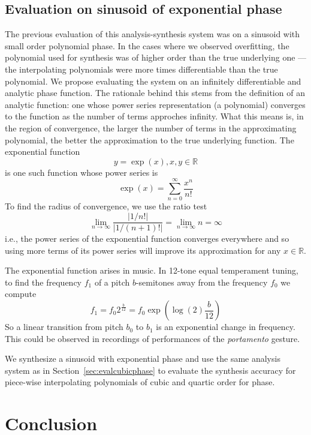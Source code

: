 \subsection{Evaluation on sinusoid of exponential phase \label{sec:evalexpphase}}

The previous evaluation of this analysis-synthesis system was on a sinusoid with
small order polynomial phase. In the cases where we observed overfitting, the
polynomial used for synthesis was of higher order than the true underlying one
--- the interpolating polynomials were more times differentiable than the true
polynomial. We propose evaluating the system on an infinitely differentiable and
analytic phase function. The rationale behind this stems from the definition of
an analytic function: one whose power series representation (a polynomial)
converges to the function as the number of terms approches infinity. What this
means is, in the region of convergence, the larger the number of terms in the
approximating polynomial, the better the approximation to the true underlying
function. The exponential function
\[
    y=\exp(x), x,y \in \mathbb{R}
\]
is one such function whose power series is
\[
    \exp(x)=\sum_{n=0}^{\infty} \frac{x^{n}}{n!}
\]
To find the radius of convergence, we use the ratio test
\[
    \lim_{n \rightarrow \infty} \frac{|1/n!|}{|1/(n+1)!|} = \lim_{n \rightarrow \infty} n = \infty
\]
i.e., the power series of the exponential function converges everywhere and so
using more terms of its power series will improve its approximation for
any $x \in \mathbb{R}$.

The exponential function arises in music. In 12-tone equal temperament tuning,
to find the frequency $f_{1}$ of a pitch $b$-semitones away from the frequency
$f_{0}$ we compute
\[
    f_{1}=f_{0}2^{\frac{b}{12}}=f_{0}\exp(\log(2)\frac{b}{12})
\]
So a linear transition from pitch $b_{0}$ to $b_{1}$ is an exponential change in
frequency. This could be observed in recordings of performances of the
\textit{portamento} gesture.

We synthesize a sinusoid with exponential phase and use the same analysis system
as in Section~\ref{sec:evalcubicphase} to evaluate the synthesis accuracy for
piece-wise interpolating polynomials of cubic and quartic order for phase.

\section{Conclusion}

